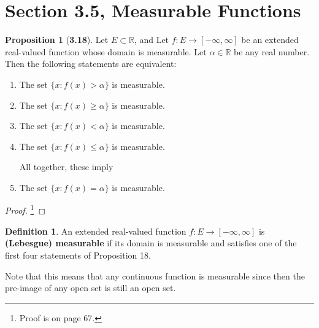 \documentclass[12pt]{article}
\newcommand{\R}{\mathbb{R}}
\theoremstyle{definition}
\newtheorem*{definition}{Definition}
\newtheorem*{prop}{Proposition}
\begin{document}
\section*{Section 3.5, Measurable Functions}

\begin{prop}[\textbf{3.18}]

    Let \( E \subset \R\), and Let \( f: E \to [-\infty, \infty] \) be an extended real-valued function whose domain is measurable. Let \( \alpha \in \R \) be any real number. Then the following statements are equivalent:

    \begin{enumerate}[label = (\roman{*})]
        
        \item The set \( \{ x: f(x) > \alpha \} \) is measurable.
        \item The set \( \{ x: f(x) \geq \alpha \} \) is measurable. 
        \item The set \( \{ x: f(x) < \alpha \} \) is measurable. 
        \item The set \( \{ x: f(x) \leq \alpha \} \) is measurable. 
        
        \noindent All together, these imply

        \item The set \( \{ x: f(x) = \alpha \} \) is measurable. 
    \end{enumerate}

        \begin{proof}\footnote{Proof is on page 67.}

        \end{proof}

    
\end{prop}

\begin{definition}
     An extended real-valued function \( f: E \to [-\infty, \infty] \) is \textbf{(Lebesgue) measurable} if its domain is measurable and satisfies one of the first four statements of Proposition 18.
\end{definition}

Note that this means that any continuous function is measurable since then the pre-image of any open set is still an open set. 
\end{document}
